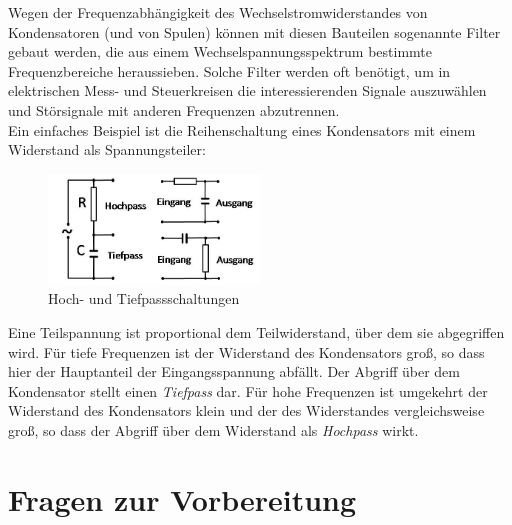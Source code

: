 Wegen der Frequenzabhängigkeit des Wechselstromwiderstandes von Kondensatoren (und von Spulen) können mit diesen Bauteilen sogenannte Filter gebaut werden, die aus einem Wechselspannungsspektrum bestimmte Frequenzbereiche heraussieben. Solche Filter werden oft benötigt, um in elektrischen Mess- und Steuerkreisen die interessierenden Signale auszuwählen und Störsignale mit anderen Frequenzen abzutrennen. \\
Ein einfaches Beispiel ist die Reihenschaltung eines Kondensators mit einem Widerstand als Spannungsteiler:
\begin{figure}[ht]
	\centering
		\includegraphics[width=0.5\textwidth]{Abbildungen/Paesse_gross.jpg}
	\caption{Hoch- und Tiefpassschaltungen}
	\label{fig:Hoch-Tiefpass}
\end{figure}
Eine Teilspannung ist proportional dem Teilwiderstand, über dem sie abgegriffen wird. Für tiefe Frequenzen ist der Widerstand des Kondensators groß, so dass hier der Hauptanteil der Eingangsspannung abfällt. Der Abgriff über dem Kondensator stellt einen \textit{Tiefpass} dar. Für hohe Frequenzen ist umgekehrt der Widerstand des Kondensators klein und der des Widerstandes vergleichsweise groß, so dass der Abgriff über dem Widerstand als \textit{Hochpass} wirkt.
\section{Fragen zur Vorbereitung}

